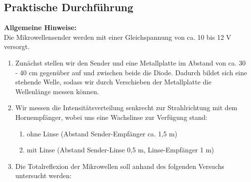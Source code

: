 \documentclass[12pt]{scrartcl}
\begin{document}
\subsection{Praktische Durchführung}
\textbf{Allgemeine Hinweise:}\\
Die Mikrowellensender werden mit einer Gleichspannung von ca. 10 bis 12 V versorgt.
\begin{enumerate}
\item Zunächst stellen wir den Sender und eine Metallplatte im Abstand von ca. 30 - 40 cm gegenüber auf und zwischen beide die Diode. Dadurch bildet sich eine stehende Welle, sodass wir durch Verschieben der Metallplatte die Wellenlänge messen können.
\item
Wir messen die Intensitätsverteilung senkrecht zur Strahlrichtung mit dem Hornempfänger, wobei uns eine Wachslinse zur Verfügung stand:
\begin{enumerate}
\item ohne Linse (Abstand Sender-Empfänger ca. 1,5 m)
\item mit Linse (Abstand Sender-Linse 0,5 m, Linse-Empfänger 1 m)
\end{enumerate}

\item Die Totalreflexion der Mikrowellen soll anhand des folgenden Versuchs untersucht werden:


\end{enumerate}
\end{document}

